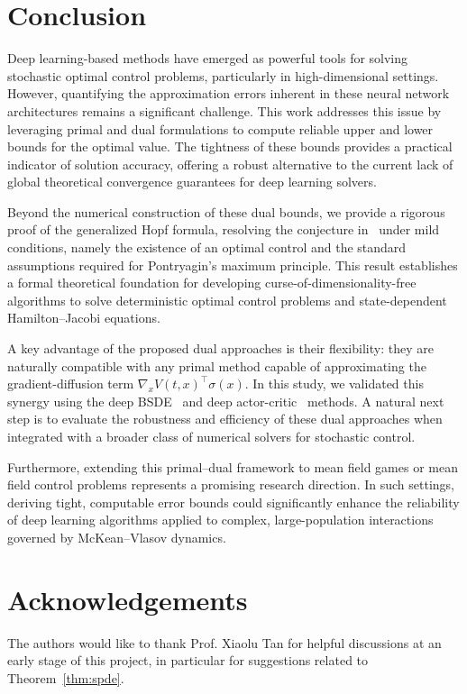 \documentclass[11pt]{article}
\numberwithin{equation}{section}
\theoremstyle{plain}
\theoremstyle{definition}
\theoremstyle{remark}
\begin{document}
\section{Conclusion} \label{sec:conclusion}
Deep learning-based methods have emerged as powerful tools for solving stochastic optimal control problems, particularly in high-dimensional settings. However, quantifying the approximation errors inherent in these neural network architectures remains a significant challenge. This work addresses this issue by leveraging primal and dual formulations to compute reliable upper and lower bounds for the optimal value. The tightness of these bounds provides a practical indicator of solution accuracy, offering a robust alternative to the current lack of global theoretical convergence guarantees for deep learning solvers. 

Beyond the numerical construction of these dual bounds, we provide a rigorous proof of the generalized Hopf formula, resolving the conjecture in~\cite{chow2019algorithm} under mild conditions, namely the existence of an optimal control and the standard assumptions required for Pontryagin's maximum principle. This result establishes a formal theoretical foundation for developing curse-of-dimensionality-free algorithms to solve deterministic optimal control problems and state-dependent Hamilton--Jacobi equations. 

A key advantage of the proposed dual approaches is their flexibility: they are naturally compatible with any primal method capable of approximating the gradient-diffusion term $\nabla_xV(t,x)^\top \sigma(x)$. In this study, we validated this synergy using the deep BSDE~\cite{E2017deepbsde} and deep actor-critic~\cite{zhou2024solving} methods. A natural next step is to evaluate the robustness and efficiency of these dual approaches when integrated with a broader class of numerical solvers for stochastic control. 

Furthermore, extending this primal--dual framework to mean field games or mean field control problems represents a promising research direction. In such settings, deriving tight, computable error bounds could significantly enhance the reliability of deep learning algorithms applied to complex, large-population interactions governed by McKean--Vlasov dynamics.

\section*{Acknowledgements}
The authors would like to thank Prof. Xiaolu Tan for helpful discussions at an early stage of this project, in particular for suggestions related to Theorem~\ref{thm:spde}. 



\end{document}
